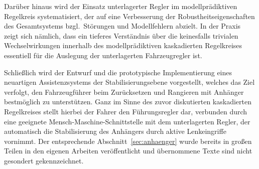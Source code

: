 Darüber hinaus wird der Einsatz unterlagerter Regler im modellprädiktiven Regelkreis systematisiert, der \ua auf eine Verbesserung der Robustheitseigenschaften des Gesamtsystems bzgl.\ Störungen und Modellfehlern abzielt. In der Praxis zeigt sich nämlich, dass ein tieferes Verständnis über die keinesfalls trivialen Wechselwirkungen innerhalb des modellprädiktiven kaskadierten Regelkreises essentiell für die Auslegung der unterlagerten Fahrzeugregler ist.

Schließlich wird der Entwurf und die prototypische Implementierung eines neuartigen Assistenzsystems der Stabilisierungsebene vorgestellt, welches das Ziel verfolgt, den Fahrzeugführer beim Zurücksetzen und Rangieren mit Anhänger bestmöglich zu unterstützen. Ganz im Sinne des zuvor diskutierten kaskadierten Regelkreises stellt hierbei der Fahrer den Führungsregler dar, verbunden durch eine geeignete Mensch-Maschine-Schnittstelle mit dem unterlagerten Regler, der automatisch die Stabilisierung des Anhängers durch aktive Lenkeingriffe vornimmt. Der entsprechende Abschnitt~\ref{sec:anhaenger} wurde bereits in großen Teilen in den eigenen Arbeiten  veröffentlicht und übernommene Texte sind nicht gesondert gekennzeichnet.


		


